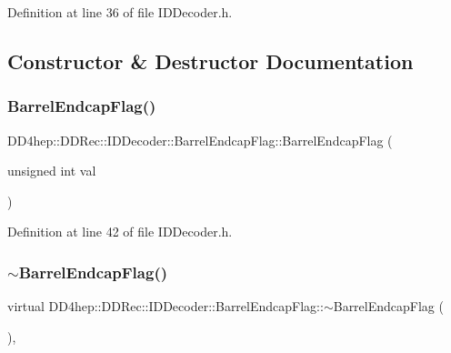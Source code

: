 Definition at line 36 of file I\+D\+Decoder.\+h.



\subsection{Constructor \& Destructor Documentation}
\hypertarget{class_d_d4hep_1_1_d_d_rec_1_1_i_d_decoder_1_1_barrel_endcap_flag_acecd6351bd9d45414c9689c222eb719b}{}\label{class_d_d4hep_1_1_d_d_rec_1_1_i_d_decoder_1_1_barrel_endcap_flag_acecd6351bd9d45414c9689c222eb719b} 
\subsubsection{\texorpdfstring{Barrel\+Endcap\+Flag()}{BarrelEndcapFlag()}}
{\footnotesize\ttfamily D\+D4hep\+::\+D\+D\+Rec\+::\+I\+D\+Decoder\+::\+Barrel\+Endcap\+Flag\+::\+Barrel\+Endcap\+Flag (\begin{DoxyParamCaption}\item[{unsigned int}]{val }\end{DoxyParamCaption})\hspace{0.3cm}{\ttfamily [inline]}}



Definition at line 42 of file I\+D\+Decoder.\+h.

\hypertarget{class_d_d4hep_1_1_d_d_rec_1_1_i_d_decoder_1_1_barrel_endcap_flag_a49909f06796881e12c94f8a545f19e28}{}\label{class_d_d4hep_1_1_d_d_rec_1_1_i_d_decoder_1_1_barrel_endcap_flag_a49909f06796881e12c94f8a545f19e28} 
\subsubsection{\texorpdfstring{$\sim$\+Barrel\+Endcap\+Flag()}{~BarrelEndcapFlag()}}
{\footnotesize\ttfamily virtual D\+D4hep\+::\+D\+D\+Rec\+::\+I\+D\+Decoder\+::\+Barrel\+Endcap\+Flag\+::$\sim$\+Barrel\+Endcap\+Flag (\begin{DoxyParamCaption}{ }\end{DoxyParamCaption})\hspace{0.3cm}{\ttfamily [inline]}, {\ttfamily [virtual]}}



